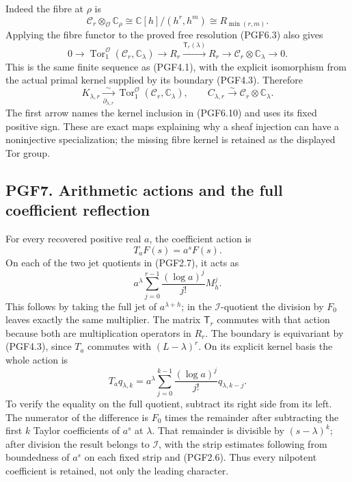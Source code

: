 Indeed the fibre at \(\rho\) is \[
\mathscr C_r\otimes_{\mathcal O}\mathbb C_\rho
\cong\mathbb C[h]/(h^r,h^m)\cong R_{\min(r,m)}.
\tag{PGF6.9}
\] Applying the fibre functor to the proved free resolution (PGF6.3)
also gives \[
0\to\operatorname{Tor}^{\mathcal O}_1(\mathscr C_r,\mathbb C_\lambda)
\to R_r\xrightarrow{\mathsf T_r(\lambda)}R_r
\to\mathscr C_r\otimes\mathbb C_\lambda\to0.
\tag{PGF6.10}
\] This is the same finite sequence as (PGF4.1), with the explicit
isomorphism from the actual primal kernel supplied by its boundary
(PGF4.3). Therefore \[
K_{\lambda,r}\xrightarrow[\partial_{\lambda,r}]{\sim}
\operatorname{Tor}^{\mathcal O}_1(\mathscr C_r,\mathbb C_\lambda),
\qquad
C_{\lambda,r}\xrightarrow{\sim}\mathscr C_r\otimes\mathbb C_\lambda.
\tag{PGF6.11}
\] The first arrow names the kernel inclusion in (PGF6.10) and uses its
fixed positive sign. These are exact maps explaining why a sheaf
injection can have a noninjective specialization; the missing fibre
kernel is retained as the displayed Tor group.

\subsection{PGF7. Arithmetic actions and the full coefficient
reflection}\label{pgf7.-arithmetic-actions-and-the-full-coefficient-reflection}

For every recovered positive real \(a\), the coefficient action is \[
T_aF(s)=a^sF(s).
\tag{PGF7.1}
\] On each of the two jet quotients in (PGF2.7), it acts as \[
a^\lambda\sum_{j=0}^{r-1}\frac{(\log a)^j}{j!}M_h^j.
\tag{PGF7.2}
\] This follows by taking the full jet of \(a^{\lambda+h}\); in the
\(\mathcal I\)-quotient the division by \(F_0\) leaves exactly the same
multiplier. The matrix \(\mathsf T_r\) commutes with that action because
both are multiplication operators in \(R_r\). The boundary is
equivariant by (PGF4.3), since \(T_a\) commutes with \((L-\lambda)^r\).
On its explicit kernel basis the whole action is \[
T_aq_{\lambda,k}
=a^\lambda\sum_{j=0}^{k-1}\frac{(\log a)^j}{j!}
q_{\lambda,k-j}.
\tag{PGF7.3}
\] To verify the equality on the full quotient, subtract its right side
from its left. The numerator of the difference is \(F_0\) times the
remainder after subtracting the first \(k\) Taylor coefficients of
\(a^s\) at \(\lambda\). That remainder is divisible by
\((s-\lambda)^k\); after division the result belongs to \(\mathcal I\),
with the strip estimates following from boundedness of \(a^s\) on each
fixed strip and (PGF2.6). Thus every nilpotent coefficient is retained,
not only the leading character.

